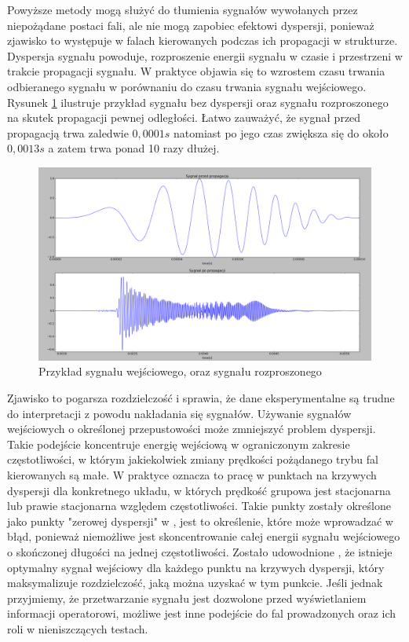 Powyższe metody mogą służyć do tłumienia sygnałów wywołanych przez niepożądane postaci fali, ale nie mogą zapobiec efektowi dyspersji, ponieważ zjawisko to występuje w falach kierowanych podczas ich propagacji w strukturze. Dyspersja sygnału powoduje, rozproszenie energii sygnału w czasie i przestrzeni w trakcie propagacji sygnału. W praktyce objawia się to wzrostem czasu trwania odbieranego sygnału w porównaniu do czasu trwania sygnału wejściowego. Rysunek \ref{fig:dyspersja} ilustruje przykład sygnału bez dyspersji oraz sygnału rozproszonego na skutek propagacji pewnej odległości. Łatwo zauważyć, że sygnał przed propagacją trwa zaledwie $0,0001 s$ natomiast po jego czas zwiększa się do około $0,0013s$ a zatem trwa ponad 10 razy dłużej.
\begin{figure}[h]
\centering
\includegraphics[width=14cm]{Zdjecia/4/dyspersja}
\caption{Przykład sygnału wejściowego, oraz sygnału rozproszonego}
\label{fig:dyspersja}
\end{figure}

 Zjawisko to pogarsza rozdzielczość i sprawia, że dane eksperymentalne są trudne do interpretacji z powodu nakładania się sygnałów. Używanie sygnałów wejściowych o określonej przepustowości może zmniejszyć problem dyspersji. Takie podejście koncentruje energię wejściową w ograniczonym zakresie częstotliwości, w którym jakiekolwiek zmiany prędkości pożądanego trybu fal kierowanych są małe. W praktyce oznacza to pracę w punktach na krzywych dyspersji dla konkretnego układu, w których prędkość grupowa jest stacjonarna lub prawie stacjonarna względem częstotliwości. Takie punkty zostały określone jako punkty "zerowej dyspersji" w \cite{kasia1}, jest to określenie, które może wprowadzać w błąd, ponieważ niemożliwe jest skoncentrowanie całej energii sygnału wejściowego o skończonej długości na jednej częstotliwości. Zostało udowodnione \cite{kasia2}, że istnieje optymalny sygnał wejściowy dla każdego punktu na krzywych dyspersji, który maksymalizuje rozdzielczość, jaką można uzyskać w tym punkcie. Jeśli jednak przyjmiemy, że przetwarzanie sygnału jest dozwolone przed wyświetlaniem informacji operatorowi, możliwe jest inne podejście do fal prowadzonych oraz ich roli w nieniszczących testach.

